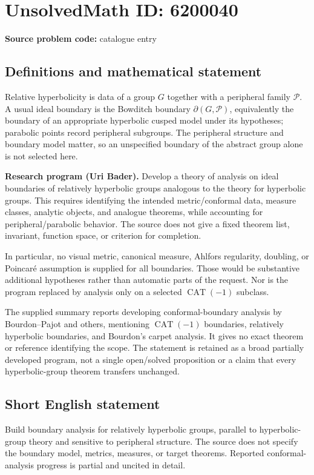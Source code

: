 \documentclass[11pt]{article}
\begin{document}
\section*{UnsolvedMath ID: 6200040}
\textbf{Source problem code:} catalogue entry
\subsection{Definitions and mathematical statement}
Relative hyperbolicity is data of a group $G$ together with a peripheral family $\mathcal P$. A usual ideal boundary is the Bowditch boundary $\partial(G,\mathcal P)$, equivalently the boundary of an appropriate hyperbolic cusped model under its hypotheses; parabolic points record peripheral subgroups. The peripheral structure and boundary model matter, so an unspecified boundary of the abstract group alone is not selected here.

\textbf{Research program (Uri Bader).} Develop a theory of analysis on ideal boundaries of relatively hyperbolic groups analogous to the theory for hyperbolic groups. This requires identifying the intended metric/conformal data, measure classes, analytic objects, and analogue theorems, while accounting for peripheral/parabolic behavior. The source does not give a fixed theorem list, invariant, function space, or criterion for completion.

In particular, no visual metric, canonical measure, Ahlfors regularity, doubling, or Poincar\'e assumption is supplied for all boundaries. Those would be substantive additional hypotheses rather than automatic parts of the request. Nor is the program replaced by analysis only on a selected $\operatorname{CAT}(-1)$ subclass.

The supplied summary reports developing conformal-boundary analysis by Bourdon--Pajot and others, mentioning $\operatorname{CAT}(-1)$ boundaries, relatively hyperbolic boundaries, and Bourdon's carpet analysis. It gives no exact theorem or reference identifying the scope. The statement is retained as a broad partially developed program, not a single open/solved proposition or a claim that every hyperbolic-group theorem transfers unchanged.
\subsection{Short English statement}
Build boundary analysis for relatively hyperbolic groups, parallel to hyperbolic-group theory and sensitive to peripheral structure. The source does not specify the boundary model, metrics, measures, or target theorems. Reported conformal-analysis progress is partial and uncited in detail.
\end{document}
